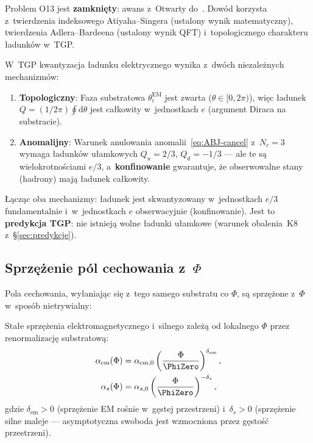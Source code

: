 \begin{remark}[Status O13]\label{rem:O13-closed}
Problem O13 jest \textbf{zamkni\k{e}ty}: awans z~Otwarty
do~.
Dow\'od korzysta z~twierdzenia indeksowego Atiyaha--Singera
(ustalony wynik matematyczny), twierdzenia Adlera--Bardeena
(ustalony wynik QFT) i~topologicznego charakteru
\l{}adunk\'ow w~TGP.
\end{remark}

\begin{proposition}%
\label{prop:charge-quantization-gauge}
W~TGP kwantyzacja ładunku elektrycznego wynika z~dwóch niezależnych
mechanizmów:
\begin{enumerate}[nosep]
    \item \textbf{Topologiczny}: Faza substratowa $\theta_i^{\mathrm{EM}}$
          jest zwarta ($\theta \in [0, 2\pi)$), więc ładunek
          $Q = (1/2\pi)\oint \mathrm{d}\theta$ jest całkowity
          w~jednostkach $e$ (argument Diraca na substracie).
    \item \textbf{Anomalijny}: Warunek anulowania anomalii~\eqref{eq:ABJ-cancel}
          z~$N_c = 3$ wymaga ładunków ułamkowych $Q_u = 2/3$,
          $Q_d = -1/3$ --- ale te są wielokrotnościami $e/3$,
          a~\textbf{konfinowanie} gwarantuje, że obserwowalne
          stany (hadrony) mają ładunek całkowity.
\end{enumerate}
Łącząc oba mechanizmy: ładunek jest skwantyzowany w~jednostkach $e/3$
fundamentalnie i~w~jednostkach $e$ obserwacyjnie (konfinowanie).
Jest to \textbf{predykcja TGP}: nie istnieją wolne ładunki ułamkowe
(warunek obalenia~K8 z~\S\ref{sec:predykcje}).
\end{proposition}

\subsection{Sprzężenie pól cechowania z~$\Phi$}%
\label{ssec:gauge-Phi-coupling}

Pola cechowania, wyłaniając się z~tego samego substratu co $\Phi$,
są sprzężone z~$\Phi$ w~sposób nietrywialny:

\begin{proposition}%
\label{prop:running-coupling}
Stałe sprzężenia elektromagnetycznego i~silnego zależą od lokalnego
$\Phi$ przez renormalizację substratową:
\begin{align}
    \alpha_{\mathrm{em}}(\Phi)
    &= \alpha_{\mathrm{em},0}
       \left(\frac{\Phi}{\PhiZero}\right)^{\delta_{\mathrm{em}}},
    \label{eq:alpha-Phi} \\
    \alpha_s(\Phi)
    &= \alpha_{s,0}
       \left(\frac{\Phi}{\PhiZero}\right)^{-\delta_s},
    \label{eq:alphas-Phi}
\end{align}
gdzie $\delta_{\mathrm{em}} > 0$ (sprzężenie EM rośnie w~gęstej przestrzeni)
i~$\delta_s > 0$ (sprzężenie silne maleje --- asymptotyczna swoboda
jest wzmocniona przez gęstość przestrzeni).
\end{proposition}

